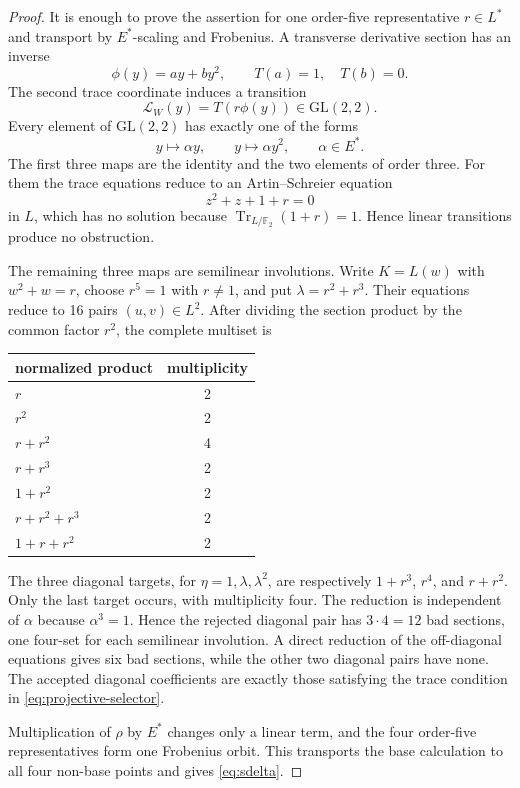 \documentclass[pdflatex,sn-mathphys-num]{sn-jnl}
\theoremstyle{thmstyleone}
\theoremstyle{thmstyletwo}
\theoremstyle{thmstylethree}
\newcommand{\F}{\mathbb F}
\newcommand{\Tr}{\operatorname{Tr}}
\begin{document}
\begin{proof}
It is enough to prove the assertion for one order-five representative $r\in L^*$ and transport by $E^*$-scaling and Frobenius.  A transverse derivative section has an inverse
\[
 \phi(y)=ay+by^2,
 \qquad T(a)=1,\quad T(b)=0.
\]
The second trace coordinate induces a transition
\[
 \mathcal L_W(y)=T(r\phi(y))\in\mathrm{GL}(2,2).
\]
Every element of $\mathrm{GL}(2,2)$ has exactly one of the forms
\[
 y\mapsto\alpha y,
 \qquad
 y\mapsto\alpha y^2,
 \qquad \alpha\in E^*.
\]
The first three maps are the identity and the two elements of order three.  For them the trace equations reduce to an Artin--Schreier equation
\[
 z^2+z+1+r=0
\]
in $L$, which has no solution because $\Tr_{L/\F_2}(1+r)=1$.  Hence linear transitions produce no obstruction.

The remaining three maps are semilinear involutions.  Write $K=L(w)$ with $w^2+w=r$, choose $r^5=1$ with $r\ne1$, and put $\lambda=r^2+r^3$.  Their equations reduce to 16 pairs $(u,v)\in L^2$.  After dividing the section product by the common factor $r^2$, the complete multiset is
\begin{center}
\begin{tabular}{@{}lc@{}}
\toprule
normalized product & multiplicity\\
\midrule
$r$ & 2\\
$r^2$ & 2\\
$r+r^2$ & 4\\
$r+r^3$ & 2\\
$1+r^2$ & 2\\
$r+r^2+r^3$ & 2\\
$1+r+r^2$ & 2\\
\bottomrule
\end{tabular}
\end{center}
The three diagonal targets, for $\eta=1,\lambda,\lambda^2$, are respectively $1+r^3$, $r^4$, and $r+r^2$.  Only the last target occurs, with multiplicity four.  The reduction is independent of $\alpha$ because $\alpha^3=1$.  Hence the rejected diagonal pair has $3\cdot4=12$ bad sections, one four-set for each semilinear involution.  A direct reduction of the off-diagonal equations gives six bad sections, while the other two diagonal pairs have none.  The accepted diagonal coefficients are exactly those satisfying the trace condition in \eqref{eq:projective-selector}.

Multiplication of $\rho$ by $E^*$ changes only a linear term, and the four order-five representatives form one Frobenius orbit.  This transports the base calculation to all four non-base points and gives \eqref{eq:sdelta}.
\end{proof}
\end{document}
